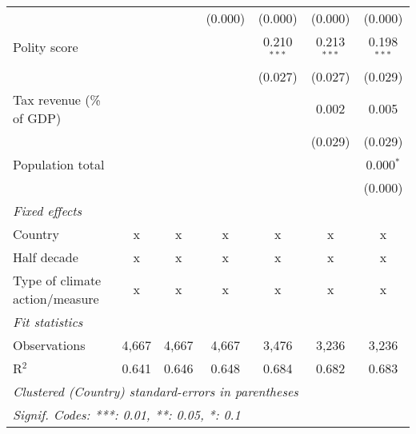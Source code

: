 \begin{tabular}{lcccccc}
                                                                             &         &                & (0.000)        & (0.000)        & (0.000)        & (0.000)\\   
   Polity score                                                              &         &                &                & 0.210$^{***}$  & 0.213$^{***}$  & 0.198$^{***}$\\   
                                                                             &         &                &                & (0.027)        & (0.027)        & (0.029)\\   
   Tax revenue (\% of GDP)                                                   &         &                &                &                & 0.002          & 0.005\\   
                                                                             &         &                &                &                & (0.029)        & (0.029)\\   
   Population total                                                          &         &                &                &                &                & 0.000$^{*}$\\   
                                                                             &         &                &                &                &                & (0.000)\\   
   \emph{Fixed effects}\\
   Country                                                                   & x       & x              & x              & x              & x              & x\\  
   Half decade                                                               & x       & x              & x              & x              & x              & x\\  
   Type of climate action/measure                                            & x       & x              & x              & x              & x              & x\\  
   \midrule \emph{Fit statistics}\\
   Observations                                                              & 4,667   & 4,667          & 4,667          & 3,476          & 3,236          & 3,236\\  
   R$^2$                                                                     & 0.641   & 0.646          & 0.648          & 0.684          & 0.682          & 0.683\\  
   \midrule
   \multicolumn{7}{l}{\emph{Clustered (Country) standard-errors in parentheses}}\\
   \multicolumn{7}{l}{\emph{Signif. Codes: ***: 0.01, **: 0.05, *: 0.1}}\\
\end{tabular}
\par\endgroup


